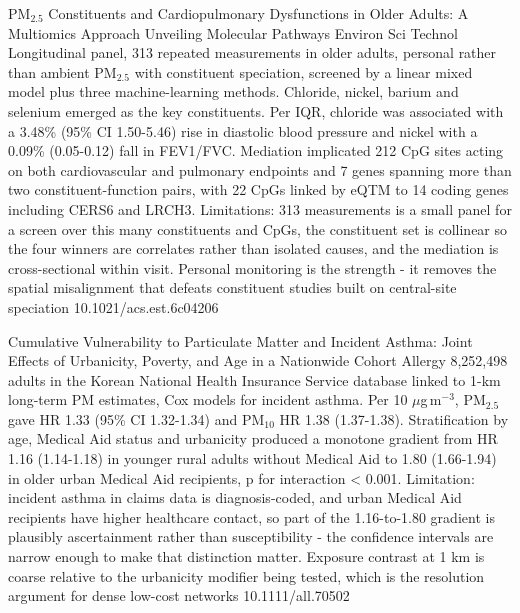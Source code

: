 \documentclass[10pt]{article}
\begin{document}

{PM$_{2.5}$ Constituents and Cardiopulmonary Dysfunctions in Older Adults: A Multiomics Approach Unveiling Molecular Pathways}
{Environ Sci Technol}
{Longitudinal panel, 313 repeated measurements in older adults, personal rather than ambient PM$_{2.5}$ with constituent speciation, screened by a linear mixed model plus three machine-learning methods. Chloride, nickel, barium and selenium emerged as the key constituents. Per IQR, chloride was associated with a 3.48\% (95\% CI 1.50-5.46) rise in diastolic blood pressure and nickel with a 0.09\% (0.05-0.12) fall in FEV1/FVC. Mediation implicated 212 CpG sites acting on both cardiovascular and pulmonary endpoints and 7 genes spanning more than two constituent-function pairs, with 22 CpGs linked by eQTM to 14 coding genes including CERS6 and LRCH3. Limitations: 313 measurements is a small panel for a screen over this many constituents and CpGs, the constituent set is collinear so the four winners are correlates rather than isolated causes, and the mediation is cross-sectional within visit. Personal monitoring is the strength - it removes the spatial misalignment that defeats constituent studies built on central-site speciation}
{10.1021/acs.est.6c04206}


{Cumulative Vulnerability to Particulate Matter and Incident Asthma: Joint Effects of Urbanicity, Poverty, and Age in a Nationwide Cohort}
{Allergy}
{8,252,498 adults in the Korean National Health Insurance Service database linked to 1-km long-term PM estimates, Cox models for incident asthma. Per 10 $\mu$g\,m$^{-3}$, PM$_{2.5}$ gave HR 1.33 (95\% CI 1.32-1.34) and PM$_{10}$ HR 1.38 (1.37-1.38). Stratification by age, Medical Aid status and urbanicity produced a monotone gradient from HR 1.16 (1.14-1.18) in younger rural adults without Medical Aid to 1.80 (1.66-1.94) in older urban Medical Aid recipients, p for interaction < 0.001. Limitation: incident asthma in claims data is diagnosis-coded, and urban Medical Aid recipients have higher healthcare contact, so part of the 1.16-to-1.80 gradient is plausibly ascertainment rather than susceptibility - the confidence intervals are narrow enough to make that distinction matter. Exposure contrast at 1 km is coarse relative to the urbanicity modifier being tested, which is the resolution argument for dense low-cost networks}
{10.1111/all.70502}
\end{document}
